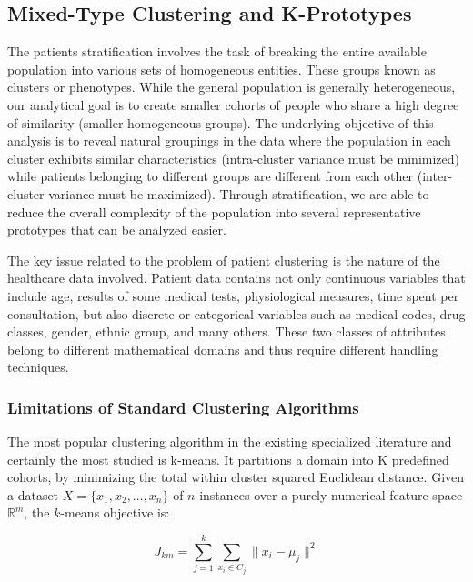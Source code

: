 \subsection{Mixed-Type Clustering and K-Prototypes}

The patients stratification involves the task of breaking the entire available population into various sets of homogeneous entities. These groups known as clusters or phenotypes. While the general population is generally heterogeneous, our analytical goal is to create smaller cohorts of people who share a high degree of similarity (smaller homogeneous groups). The underlying objective of this analysis is to reveal natural groupings in the data where the population in each cluster exhibits similar characteristics (intra-cluster variance must be minimized) while patients belonging to different groups are different from each other (inter-cluster variance must be maximized). Through stratification, we are able to reduce the overall complexity of the population into several representative prototypes that can be analyzed easier.

The key issue related to the problem of patient clustering is the nature of the healthcare data involved. Patient data contains not only continuous variables that include age, results of some medical tests, physiological measures, time spent per consultation, but also discrete or categorical variables such as medical codes, drug classes, gender, ethnic group, and many others. These two classes of attributes belong to different mathematical domains and thus require different handling techniques.

\subsubsection{Limitations of Standard Clustering Algorithms}
\label{ch:clustering_limitations}

The most popular clustering algorithm in the existing specialized literature and certainly the most studied is k-means. It partitions a domain into K predefined cohorts, by minimizing the total within cluster squared Euclidean distance. Given a dataset $X = \{x_1, x_2, \ldots, x_n\}$ of $n$ instances over a purely numerical feature space $\mathbb{R}^m$, the $k$-means objective is:

\begin{equation}
    J_{km} = \sum_{j=1}^{k} \sum_{x_i \in C_j} \|x_i - \mu_j\|^2
    \label{eq:kmeans}
\end{equation}

